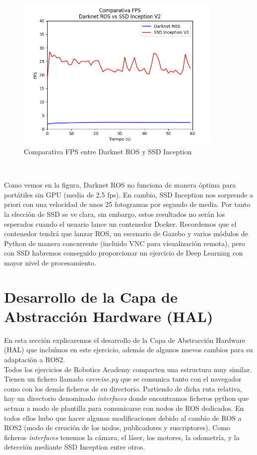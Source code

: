 \begin{figure} [H]
  \begin{center}
    \includegraphics[width=10cm]{imagenes/comparativa-fps-models.png}
  \end{center}
  \caption[Comparativa FPS entre Darknet ROS y SSD Inception]{Comparativa FPS entre Darknet ROS y SSD Inception}
  \label{fig:comparativa_fps_models}
\end{figure}\

Como vemos en la figura, Darknet ROS no funciona de manera óptima para portátiles sin GPU (media de 2.5 fps). En cambio, SSD Inception nos sorprende a priori con una velocidad de unos 25 fotogramas por segundo de media. Por tanto la elección de SSD se ve clara, sin embargo, estos resultados no serán los esperados cuando el usuario lance un contenedor Docker. Recordemos que el contenedor tendrá que lanzar ROS, un escenario de Gazebo y varios módulos de Python de manera concurrente (incluido VNC para visualización remota), pero con SSD habremos conseguido proporcionar un ejercicio de Deep Learning con mayor nivel de procesamiento.\\




\section{Desarrollo de la Capa de Abstracción Hardware (HAL)}
\label{sec:hal_sim_follow_person}

En esta sección explicaremos el desarrollo de la Capa de Abstracción Hardware (HAL) que incluímos en este ejercicio, además de algunos nuevos cambios para su adaptación a ROS2.\\

Todos los ejercicios de Robotics Academy comparten una estructura muy similar. Tienen un fichero llamado \textit{exercise.py} que se comunica tanto con el navegador como con los demás ficheros de su directorio. Partiendo de dicha ruta relativa, hay un directorio denominado \textit{interfaces} donde encontramos ficheros python que actuan a modo de plantilla para comunicarse con nodos de ROS dedicados. En todos ellos hubo que hacer algunas modificaciones debido al cambio de ROS a ROS2 (modo de creación de los nodos, publicadores y suscriptores). Como ficheros \textit{interfaces} tenemos la cámara, el láser, los motores, la odometría, y la detección mediante SSD Inception entre otros.\\

